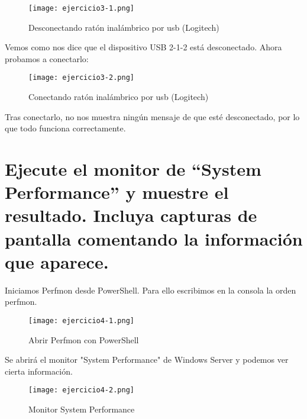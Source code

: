 	\begin{figure}[H] 
		\centering
		\texttt{[image: ejercicio3-1.png]} 
		\label{figura2} 
		\caption{Desconectando ratón inalámbrico por usb (Logitech)}
	\end{figure}
	
	Vemos como nos dice que el dispositivo USB 2-1-2 está desconectado. Ahora probamos a conectarlo:
	
	\begin{figure}[H] 
		\centering
		\texttt{[image: ejercicio3-2.png]} 
		\label{figura2} 
		\caption{Conectando ratón inalámbrico por usb (Logitech)}
	\end{figure}
	
	Tras conectarlo, no nos muestra ningún mensaje de que esté desconectado, por lo que todo funciona correctamente.

	\section{Ejecute el monitor de “System Performance” y muestre el resultado. Incluya capturas de pantalla comentando la información que aparece.}
	
	Iniciamos Perfmon desde PowerShell. Para ello escribimos en la consola la orden perfmon.
	
	\begin{figure}[H] 
		\centering
		\texttt{[image: ejercicio4-1.png]} 
		\label{figura2} 
		\caption{Abrir Perfmon con PowerShell}
	\end{figure}
	
	Se abrirá el monitor "System Performance" de Windows Server y podemos ver cierta información.
	\begin{figure}[H] 
		\centering
		\texttt{[image: ejercicio4-2.png]} 
		\label{figura2} 
		\caption{Monitor System Performance}
	\end{figure}
	
